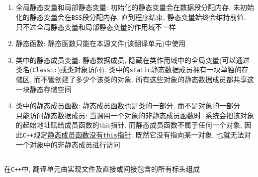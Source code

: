 \subsection[ISOK:{\tt static}关键字]{}
\begin{enumerate}
	\item 全局静态变量和局部静态变量: 初始化的静态变量会在数据段分配内存, 未初始化的静态变量会在{\tt BSS}段分配内存. 
			直到程序结束, 静态变量始终会维持前值. 只不过全局静态变量和局部静态变量的作用域不一样
	\item 静态函数: 静态函数只能在本源文件(该翻译单元)中使用
	\item 类中的静态成员变量: 静态数据成员, 隐藏在类作用域中的全局变量(可以通过类名({\tt Class::})或类对象访问). 
			类中的{\tt static}静态数据成员拥有一块单独的存储区, 而不管创建了多少个该类的对象. 
			所有这些对象的静态数据成员都共享这一块静态存储空间
	\item 类中的静态成员函数: 静态成员函数也是类的一部分, 而不是对象的一部分
		\\  只能访问静态数据成员: 
			当调用一个对象的非静态成员函数时, 系统会把该对象的起始地址赋给成员函数的this指针. 
			而静态成员函数不属于任何一个对象, 因此{\tt C++}规定\uline{静态成员函数没有{\tt this}指针}. 
			既然它没有指向某一对象, 也就无法对一个对象中的非静态成员进行访问
\end{enumerate}

\subsection[ISOK:{\tt extern}关键字与链接性]{}

在{\tt C++}中, 翻译单元由实现文件及直接或间接包含的所有标头组成

